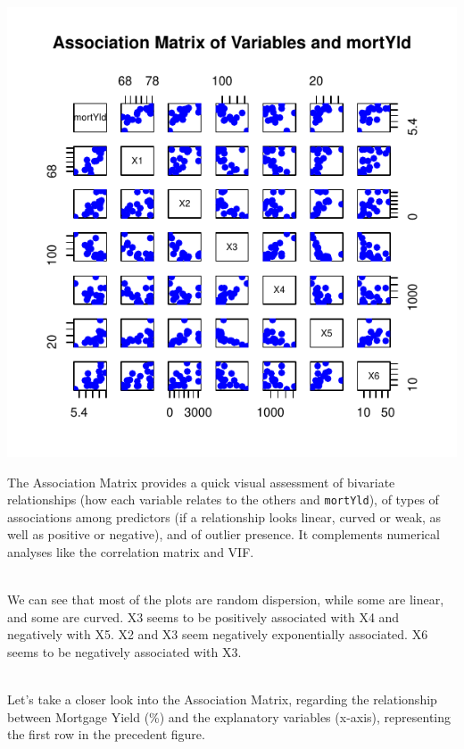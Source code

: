 \documentclass[
  11pt,
]{article}
\begin{document}
\includegraphics{Figs/unnamed-chunk-5-1.pdf}

The Association Matrix provides a quick visual assessment of bivariate
relationships (how each variable relates to the others and
\texttt{mortYld}), of types of associations among predictors (if a
relationship looks linear, curved or weak, as well as positive or
negative), and of outlier presence. It complements numerical analyses
like the correlation matrix and VIF.\\
\strut \\
We can see that most of the plots are random dispersion, while some are
linear, and some are curved. X3 seems to be positively associated with
X4 and negatively with X5. X2 and X3 seem negatively exponentially
associated. X6 seems to be negatively associated with X3.\\
\strut \\
Let's take a closer look into the Association Matrix, regarding the
relationship between Mortgage Yield (\%) and the explanatory variables
(x-axis), representing the first row in the precedent figure.
\end{document}
